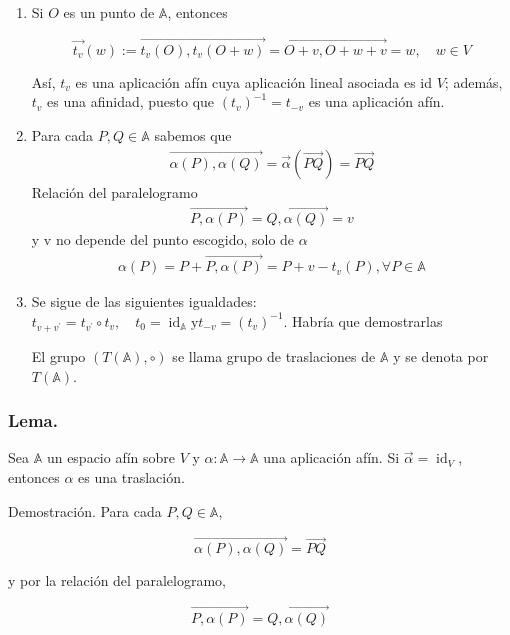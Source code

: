 \documentclass[12pt, a4paper, ones, notitlepage, openany,titlepage]{article}
\begin{document}
\begin{enumerate}
\item Si $O$ es un punto de $\mathbb{A}$, entonces

$$
\overrightarrow{t_{v}}(w):=\overrightarrow{t_{v}(O), t_{v}(O+w)}=\overrightarrow{O+v, O+w+v}=w, \quad w \in V
$$

Así, $t_{v}$ es una aplicación afín cuya aplicación lineal asociada es id $V$; además, $t_{v}$ es una afinidad, puesto que $\left(t_{v}\right)^{-1}=t_{-v}$ es una aplicación afín.

\item Para cada $P,Q\in\mathbb{A}$ sabemos que
\begin{gather*}
	\overrightarrow{\alpha(P),\alpha(Q)}=\vec{\alpha}(\overrightarrow{PQ}) = \overrightarrow{PQ}
\end{gather*}
Relación del paralelogramo
\begin{gather*}
	\overrightarrow{P,\alpha(P)} = \overrightarrow{Q,\alpha(Q)} = v
\end{gather*}
y v no depende del punto escogido, solo de $\alpha$
\begin{gather*}
	\alpha(P) = P+\overrightarrow{P,\alpha(P)} = P + v - t_{v}(P),\forall P\in\mathbb{A}
\end{gather*}

\item Se sigue de las siguientes igualdades: $t_{v+v^{\prime}}=t_{v^{\prime}} \circ t_{v}, \quad t_{0}=\operatorname{id}_{\mathbb{A}} \mathrm{y} t_{-v}=\left(t_{v}\right)^{-1}$. Habría que demostrarlas

El grupo $(T(\mathbb{A}), \circ)$ se llama grupo de traslaciones de $\mathbb{A}$ y se denota por $T(\mathbb{A})$.

\end{enumerate}


\subsubsection{Lema.} Sea $\mathbb{A}$ un espacio afín sobre $V$ y $\alpha: \mathbb{A} \rightarrow \mathbb{A}$ una aplicación afín. Si $\vec{\alpha}=\operatorname{id}_{V}$, entonces $\alpha$ es una traslación.

Demostración. Para cada $P, Q \in \mathbb{A}$,

$$
\overrightarrow{\alpha(P), \alpha(Q)}=\overrightarrow{P Q}
$$

y por la relación del paralelogramo,

$$
\overrightarrow{P, \alpha(P)}=\overrightarrow{Q, \alpha(Q)}
$$
\end{document}
